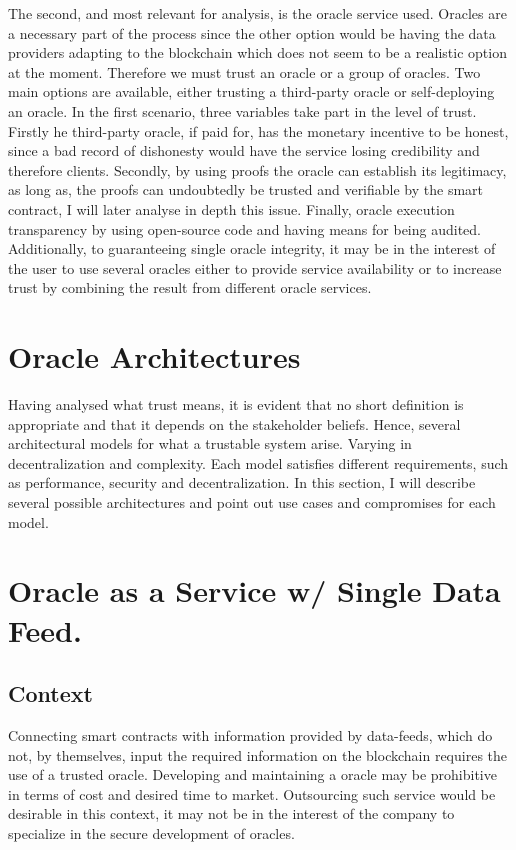The second, and most relevant for analysis, is the oracle service used. Oracles are a necessary part of the process since the other option would be having the data providers adapting to the blockchain which does not seem to be a realistic option at the moment. Therefore we must trust an oracle or a group of oracles. Two main options are available, either trusting a third-party oracle or self-deploying an oracle. In the first scenario, three variables take part in the level of trust. Firstly he third-party oracle, if paid for, has the monetary incentive to be honest, since a bad record of dishonesty would have the service losing credibility and therefore clients. Secondly, by using proofs the oracle can establish its legitimacy, as long as, the proofs can undoubtedly be trusted and verifiable by the smart contract, I will later analyse in depth this issue. Finally, oracle execution transparency by using open-source code and having means for being audited. Additionally, to guaranteeing single oracle integrity, it may be in the interest of the user to use several oracles either to provide service availability or to increase trust by combining the result from different oracle services.


\section{Oracle Architectures}

Having analysed what trust means, it is evident that no short definition is appropriate and that it depends on the stakeholder beliefs. Hence, several architectural models for what a trustable system arise. Varying in decentralization and complexity. Each model satisfies different requirements, such as performance, security and decentralization.
In this section, I will describe several possible architectures and point out use cases and compromises for each model.

\section{Oracle as a Service w/ Single Data Feed.}\label{OaaSwSingleDataFeed}

\subsection{Context}
Connecting smart contracts with information provided by data-feeds, which do not, by themselves, input the required information on the blockchain requires the use of a trusted oracle. Developing and maintaining a oracle may be prohibitive in terms of cost and desired time to market. Outsourcing such service would be desirable in this context, it may not be in the interest of the company to specialize in the secure development of oracles.

